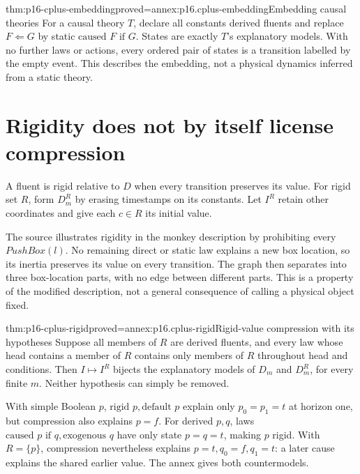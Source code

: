 \begin{hbtheorem}{thm:p16-cplus-embedding}{proved=annex:p16.cplus-embedding}{Embedding causal theories}
For a causal theory \(T\), declare all constants derived fluents and
replace \(F\Leftarrow G\) by static \(\text{caused }F\text{ if }G\).
States are exactly \(T\)'s explanatory models.
With no further laws or actions, every ordered pair of states is a
transition labelled by the empty event. This describes the embedding,
not a physical dynamics inferred from a static theory.
\end{hbtheorem}

\section{Rigidity does not by itself license compression}
\label{sec:p16-cplus-rigid}

A fluent is rigid relative to \(D\) when every transition preserves its
value. For rigid set \(R\), form \(D_m^R\) by erasing timestamps on
its constants. Let \(I^R\) retain other coordinates and give each
\(c\in R\) its initial value.

The source illustrates rigidity in the monkey description by prohibiting
every \(PushBox(l)\). No remaining direct or static law explains a new
box location, so its inertia preserves its value on every transition.
The graph then separates into three box-location parts, with no edge
between different parts. This is a property of the modified description,
not a general consequence of calling a physical object fixed.

\begin{hbtheorem}{thm:p16-cplus-rigid}{proved=annex:p16.cplus-rigid}{Rigid-value compression with its hypotheses}
Suppose all members of \(R\) are derived fluents, and every law whose
head contains a member of \(R\) contains only members of \(R\)
throughout head and conditions. Then \(I\mapsto I^R\) bijects the
explanatory models of \(D_m\) and \(D_m^R\), for every finite \(m\).
Neither hypothesis can simply be removed.
\end{hbtheorem}

With simple Boolean \(p\), \(\text{rigid }p,\text{default }p\)
explain only \(p_0=p_1=t\) at horizon one, but compression also explains
\(p=f\). For derived \(p,q\), laws
\(\text{caused }p\text{ if }q,\text{exogenous }q\) have only state
\(p=q=t\), making \(p\) rigid. With \(R=\{p\}\), compression nevertheless
explains \(p=t,q_0=f,q_1=t\): a later cause explains the shared earlier
value. The annex gives both countermodels.

